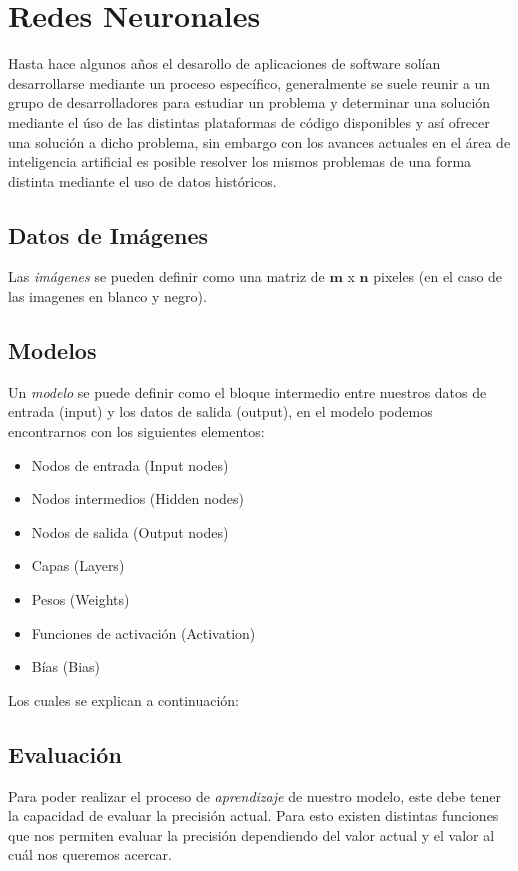 \section{Redes Neuronales}

Hasta hace algunos años el desarollo de aplicaciones de software solían desarrollarse mediante un proceso específico, generalmente se suele reunir a un grupo de desarrolladores para estudiar un problema y determinar una solución mediante el úso de las distintas plataformas de código disponibles y así ofrecer una solución a dicho problema, sin embargo con los avances actuales en el área de inteligencia artificial es posible resolver los mismos problemas de una forma distinta mediante el uso de datos históricos. 

\subsection{Datos de Imágenes}
Las \emph{imágenes} se pueden definir como una matriz de $\mathbf{m}$ x $\mathbf{n}$ pixeles (en el caso de las imagenes en blanco y negro).

\subsection{Modelos}
Un \emph{modelo} se puede definir como el bloque intermedio entre nuestros datos de entrada (input) y los datos de salida (output), en el modelo podemos encontrarnos con los siguientes elementos:

\begin{itemize}
    \item Nodos de entrada (Input nodes)
    \item Nodos intermedios (Hidden nodes)
    \item Nodos de salida (Output nodes)
    \item Capas (Layers)
    \item Pesos (Weights)
    \item Funciones de activación (Activation)
    \item Bías (Bias)
\end{itemize}

Los cuales se explican a continuación:

\subsection{Evaluación}
Para poder realizar el proceso de \emph{aprendizaje} de nuestro modelo, este debe tener la capacidad de evaluar la precisión actual. Para esto existen distintas funciones que nos permiten evaluar la precisión dependiendo del valor actual y el valor al cuál nos queremos acercar.

